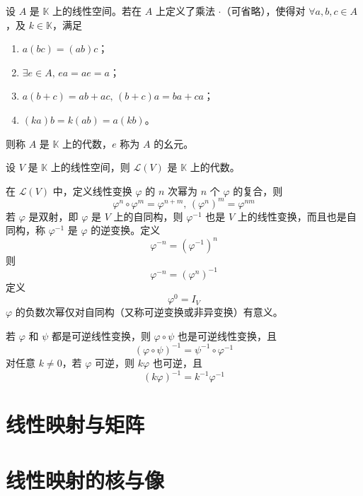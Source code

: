 \begin{definition}
  设 $A$ 是 $\mathbb{K}$ 上的线性空间。若在 $A$ 上定义了乘法 $\cdot$（可省略），使得对 $\forall a,b,c \in A$，及 $k \in \mathbb{K}$，满足
  \begin{enumerate}
    \item $a(bc) = (ab)c$；
    \item $\exists e \in A,\, ea = ae = a$；
    \item $a(b + c) = ab + ac,\, (b + c)a = ba + ca$；
    \item $(ka)b = k(ab) = a(kb)$。
  \end{enumerate}
  则称 $A$ 是 $\mathbb{K}$ 上的代数，$e$ 称为 $A$ 的幺元。
\end{definition}

\begin{theorem}
  设 $V$ 是 $\mathbb{K}$ 上的线性空间，则 $\mathcal{L}(V)$ 是 $\mathbb{K}$ 上的代数。
\end{theorem}

\begin{proposition}
  在 $\mathcal{L}(V)$ 中，定义线性变换 $\varphi$ 的 $n$ 次幂为 $n$ 个 $\varphi$ 的复合，则
  \[\varphi^n \circ \varphi^m = \varphi^{n + m},\, (\varphi^n)^m = \varphi^{nm}\]
  若 $\varphi$ 是双射，即 $\varphi$ 是 $V$ 上的自同构，则 $\varphi^{-1}$ 也是 $V$ 上的线性变换，而且也是自同构，称 $\varphi^{-1}$ 是 $\varphi$ 的逆变换。定义
  \[\varphi^{-n} = (\varphi^{-1})^n\]
  则
  \[\varphi^{-n} = (\varphi^n)^{-1}\]
  定义
  \[\varphi^0 = I_V\]
  $\varphi$ 的负数次幂仅对自同构（又称可逆变换或非异变换）有意义。
\end{proposition}

\begin{proposition}
  若 $\varphi$ 和 $\psi$ 都是可逆线性变换，则 $\varphi \circ \psi$ 也是可逆线性变换，且
  \[(\varphi \circ \psi)^{-1} = \psi^{-1} \circ \varphi^{-1}\]
  对任意 $k \ne 0$，若 $\varphi$ 可逆，则 $k\varphi$ 也可逆，且
  \[(k\varphi)^{-1} = k^{-1}\varphi^{-1}\]
\end{proposition}



\section{线性映射与矩阵}







\section{线性映射的核与像}






